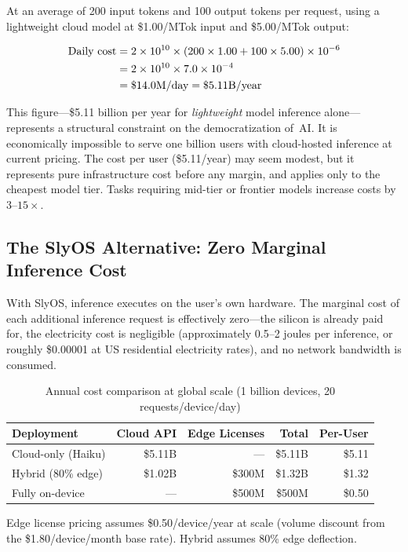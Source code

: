 \documentclass[12pt, letterpaper, twoside]{report}
\begin{document}
At an average of 200 input tokens and 100 output tokens per request, using a lightweight cloud model at \$1.00/MTok input and \$5.00/MTok output:

\begin{align}
\text{Daily cost} &= 2 \times 10^{10} \times (200 \times 1.00 + 100 \times 5.00) \times 10^{-6} \notag \\
  &= 2 \times 10^{10} \times 7.0 \times 10^{-4} \notag \\
  &= \$14.0\text{M/day} = \$5.11\text{B/year} \notag
\end{align}

This figure---\$5.11 billion per year for \textit{lightweight} model inference alone---represents a structural constraint on the democratization of~AI\@. It is economically impossible to serve one billion users with cloud-hosted inference at current pricing. The cost per user (\$5.11/year) may seem modest, but it represents pure infrastructure cost before any margin, and applies only to the cheapest model tier. Tasks requiring mid-tier or frontier models increase costs by $3$--$15\times$.

\subsection{The SlyOS Alternative: Zero Marginal Inference Cost}

With SlyOS, inference executes on the user's own hardware. The marginal cost of each additional inference request is effectively zero---the silicon is already paid for, the electricity cost is negligible (approximately 0.5--2 joules per inference, or roughly \$0.00001 at US residential electricity rates), and no network bandwidth is consumed.

\begin{table}[H]
\centering
\caption{Annual cost comparison at global scale (1 billion devices, 20 requests/device/day)}
\label{tab:global_cost}
{\small
\begin{tabular}{@{}lrrrr@{}}
\toprule
\textbf{Deployment} & \textbf{Cloud API} & \textbf{Edge Licenses} & \textbf{Total} & \textbf{Per-User} \\
\midrule
Cloud-only (Haiku) & \$5.11B & --- & \$5.11B & \$5.11 \\
Hybrid (80\% edge) & \$1.02B & \$300M & \$1.32B & \$1.32 \\
Fully on-device & --- & \$500M & \$500M & \$0.50 \\
\bottomrule
\end{tabular}
}
\vspace{4pt}
{\scriptsize Edge license pricing assumes \$0.50/device/year at scale (volume discount from the \$1.80/device/month base rate). Hybrid assumes 80\% edge deflection.}
\end{table}
\end{document}
